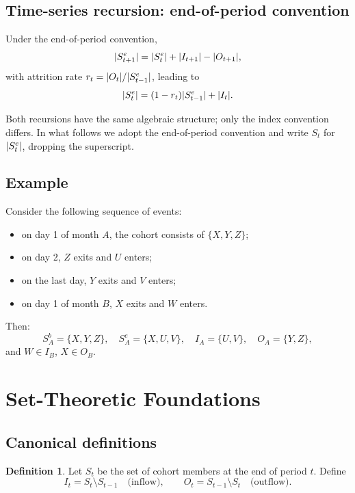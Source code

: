 \documentclass[a4paper,oneside,12pt]{extarticle}
\theoremstyle{plain}
\theoremstyle{definition}
\newtheorem{definition}[proposition]{Definition}
\theoremstyle{remark}
\DeclarePairedDelimiter{\abs}{\lvert}{\rvert}
\begin{document}
\subsection{Time-series recursion: end-of-period convention}

Under the end-of-period convention,
\begin{equation}
\label{eq:main_equation_3}
\abs{S_{t+1}^e} = \abs{S_t^e} + \abs{I_{t+1}} - \abs{O_{t+1}},
\end{equation}
with attrition rate $r_t = \abs{O_t}/\abs{S_{t-1}^e}$, leading to
\begin{equation}
\label{eq:main_equation_4}
\abs{S_t^e} = (1-r_t)\abs{S_{t-1}^e} + \abs{I_t}.
\end{equation}

Both recursions have the same algebraic structure; only the index
convention differs. In what follows we adopt the end-of-period convention
and write $S_t$ for $\abs{S_t^e}$, dropping the superscript.

\subsection{Example}

Consider the following sequence of events:
\begin{itemize}
\item on day 1 of month $A$, the cohort consists of $\{X,Y,Z\}$;
\item on day 2, $Z$ exits and $U$ enters;
\item on the last day, $Y$ exits and $V$ enters;
\item on day 1 of month $B$, $X$ exits and $W$ enters.
\end{itemize}
Then:
\[
S_A^b = \{X,Y,Z\},\quad S_A^e = \{X,U,V\},\quad
I_A = \{U,V\},\quad O_A = \{Y,Z\},
\]
and $W \in I_B$, $X \in O_B$.


\section{Set-Theoretic Foundations}
\label{sec:settheory}

\subsection{Canonical definitions}

\begin{definition}
Let $S_t$ be the set of cohort members at the end of period $t$. Define
\[
I_t = S_t \setminus S_{t-1} \quad\text{(inflow)}, \qquad
O_t = S_{t-1} \setminus S_t \quad\text{(outflow)}.
\]
\end{definition}
\end{document}
